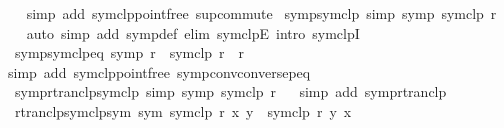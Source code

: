 \begin{isabellebody}
%
\isadelimproof
\ \ %
\endisadelimproof
%
\isatagproof
{}\isamarkupfalse%
{\isacharparenleft}{\kern0pt}simp\ add{\isacharcolon}{\kern0pt}\ symclp{\isacharunderscore}{\kern0pt}pointfree\ sup{\isachardot}{\kern0pt}commute{\isacharparenright}{\kern0pt}%
\endisatagproof
{\isafoldproof}%
%
\isadelimproof
\isanewline
%
\endisadelimproof
\isanewline
{}\isamarkupfalse%
\ symp{\isacharunderscore}{\kern0pt}symclp\ {\isacharbrackleft}{\kern0pt}simp{\isacharbrackright}{\kern0pt}{\isacharcolon}{\kern0pt}\ {\isachardoublequoteopen}symp\ {\isacharparenleft}{\kern0pt}symclp\ r{\isacharparenright}{\kern0pt}{\isachardoublequoteclose}\isanewline
%
\isadelimproof
\ \ %
\endisadelimproof
%
\isatagproof
{}\isamarkupfalse%
{\isacharparenleft}{\kern0pt}auto\ simp\ add{\isacharcolon}{\kern0pt}\ symp{\isacharunderscore}{\kern0pt}def\ elim{\isacharcolon}{\kern0pt}\ symclpE\ intro{\isacharcolon}{\kern0pt}\ symclpI{\isacharparenright}{\kern0pt}%
\endisatagproof
{\isafoldproof}%
%
\isadelimproof
\isanewline
%
\endisadelimproof
\isanewline
{}\isamarkupfalse%
\ symp{\isacharunderscore}{\kern0pt}symclp{\isacharunderscore}{\kern0pt}eq{\isacharcolon}{\kern0pt}\ {\isachardoublequoteopen}symp\ r\ {\isasymLongrightarrow}\ symclp\ r\ {\isacharequal}{\kern0pt}\ r{\isachardoublequoteclose}\isanewline
%
\isadelimproof
\ \ %
\endisadelimproof
%
\isatagproof
{}\isamarkupfalse%
{\isacharparenleft}{\kern0pt}simp\ add{\isacharcolon}{\kern0pt}\ symclp{\isacharunderscore}{\kern0pt}pointfree\ symp{\isacharunderscore}{\kern0pt}conv{\isacharunderscore}{\kern0pt}conversep{\isacharunderscore}{\kern0pt}eq{\isacharparenright}{\kern0pt}%
\endisatagproof
{\isafoldproof}%
%
\isadelimproof
\isanewline
%
\endisadelimproof
\isanewline
{}\isamarkupfalse%
\ symp{\isacharunderscore}{\kern0pt}rtranclp{\isacharunderscore}{\kern0pt}symclp\ {\isacharbrackleft}{\kern0pt}simp{\isacharbrackright}{\kern0pt}{\isacharcolon}{\kern0pt}\ {\isachardoublequoteopen}symp\ {\isacharparenleft}{\kern0pt}symclp\ r{\isacharparenright}{\kern0pt}\isactrlsup {\isacharasterisk}{\kern0pt}\isactrlsup {\isacharasterisk}{\kern0pt}{\isachardoublequoteclose}\isanewline
%
\isadelimproof
\ \ %
\endisadelimproof
%
\isatagproof
{}\isamarkupfalse%
{\isacharparenleft}{\kern0pt}simp\ add{\isacharcolon}{\kern0pt}\ symp{\isacharunderscore}{\kern0pt}rtranclp{\isacharparenright}{\kern0pt}%
\endisatagproof
{\isafoldproof}%
%
\isadelimproof
\isanewline
%
\endisadelimproof
\isanewline
{}\isamarkupfalse%
\ rtranclp{\isacharunderscore}{\kern0pt}symclp{\isacharunderscore}{\kern0pt}sym\ {\isacharbrackleft}{\kern0pt}sym{\isacharbrackright}{\kern0pt}{\isacharcolon}{\kern0pt}\ {\isachardoublequoteopen}{\isacharparenleft}{\kern0pt}symclp\ r{\isacharparenright}{\kern0pt}\isactrlsup {\isacharasterisk}{\kern0pt}\isactrlsup {\isacharasterisk}{\kern0pt}\ x\ y\ {\isasymLongrightarrow}\ {\isacharparenleft}{\kern0pt}symclp\ r{\isacharparenright}{\kern0pt}\isactrlsup {\isacharasterisk}{\kern0pt}\isactrlsup {\isacharasterisk}{\kern0pt}\ y\ x{\isachardoublequoteclose}\isanewline

\end{isabellebody}
